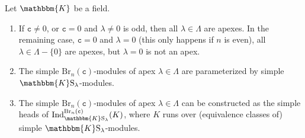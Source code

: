 \documentclass[a4paper,11pt]{amsart}
\newcommand{\setstuff}[1]{\mathrm{#1}}
\newcommand{\KK}{\mathbbm{K}}
\newcommand{\varsym}[1]{\mathtt{#1}}
\newcommand{\cvar}{\varsym{c}}
\numberwithin{equation}{section}
\begin{document}
\begin{theorem}\label{theorem:brauer}
Let $\KK$ be a field.
\begin{enumerate}

\item If $\cvar\neq 0$, or $\cvar=0$ and $\lambda\neq 0$ is odd, 
then all $\lambda\in\Lambda$ are apexes. In the remaining case, 
$\cvar=0$ and $\lambda=0$ (this only happens if $n$ is even), 
all $\lambda\in\Lambda-\{0\}$ are apexes, but $\lambda=0$ is not an apex.

\item The simple $\setstuff{Br}_{n}(\cvar)$-modules of 
apex $\lambda\in\Lambda$ 
are parameterized by simple $\KK\setstuff{S}_{\lambda}$-modules.

\item The simple $\setstuff{Br}_{n}(\cvar)$-modules of 
apex $\lambda\in\Lambda$ can be constructed as 
the simple heads of
$\mathrm{Ind}_{\KK\setstuff{S}_{\lambda}}^{\setstuff{Br}_{n}(\cvar)}(K)$, 
where $K$ runs over (equivalence classes of) 
simple $\KK\setstuff{S}_{\lambda}$-modules.

\end{enumerate}
\end{theorem}
\end{document}
